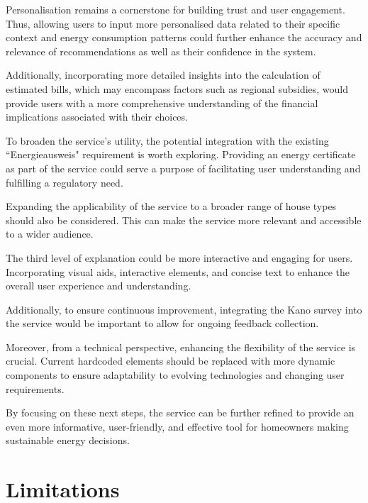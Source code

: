 Personalisation remains a cornerstone for building trust and user engagement. 
Thus, allowing users to input more personalised data related to their specific context and energy consumption patterns could further enhance the accuracy and relevance of recommendations as well as their confidence in the system.

Additionally, incorporating more detailed insights into the calculation of estimated bills, which may encompass factors such as regional subsidies, would provide users with a more comprehensive understanding of the financial implications associated with their choices.

To broaden the service's utility, the potential integration with the existing ``Energieausweis" requirement is worth exploring. 
Providing an energy certificate as part of the service could serve a purpose of facilitating user understanding and fulfilling a regulatory need.

Expanding the applicability of the service to a broader range of house types should also be considered. 
This can make the service more relevant and accessible to a wider audience. 

The third level of explanation could be more interactive and engaging for users. 
Incorporating visual aids, interactive elements, and concise text to enhance the overall user experience and understanding.

Additionally, to ensure continuous improvement, integrating the Kano survey into the service would be important to allow for ongoing feedback collection. 

Moreover, from a technical perspective, enhancing the flexibility of the service is crucial. 
Current hardcoded elements should be replaced with more dynamic components to ensure adaptability to evolving technologies and changing user requirements. 

By focusing on these next steps, the service can be further refined to provide an even more informative, user-friendly, and effective tool for homeowners making sustainable energy decisions.


\section{Limitations}

